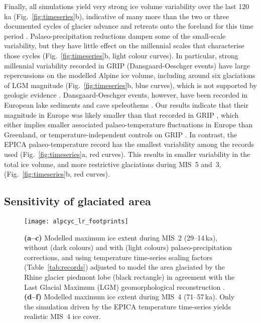 \documentclass[tc, manuscript]{copernicus}
\begin{document}
    Finally, all simulations yield very strong ice volume variability over the
    last 120\,ka (Fig.~\ref{fig:timeseries}b), indicative of many more than the
    two or three documented cycles of glacier advance and retreats onto the
    foreland for this time period \citep{Preusser.2004, Ivy-Ochs.etal.2008}.
    Palaeo-precipitation reductions dampen some of the small-scale variability,
    but they have little effect on the millennial scales that characterise
    those cycles (Fig.~\ref{fig:timeseries}b, light colour curves). In
    particular, strong millennial variability recorded in GRIP
     (Dansgaard-Oeschger events) have large repercussions
    on the modelled Alpine ice volume, including around six glaciations of LGM
    magnitude (Fig.~\ref{fig:timeseries}b, blue curves), which is not supported
    by geologic evidence \citep{Preusser.2004, Ivy-Ochs.etal.2008}.
    Dansgaard-Oeschger events, however, have been recorded in European
    lake sediments \citep{Wohlfarth.etal.2008} and cave speleothems
    \citep{Spotl.Mangini.2002, Luetscher.etal.2015}. Our results indicate that
    their magnitude in Europe was likely smaller than that recorded in
    GRIP , which either implies smaller associated
    palaeo-temperature fluctuations in Europe than Greenland, or
    temperature-independent controls on GRIP . In contrast,
    the EPICA palaeo-temperature record has the smallest variability among the
    records
    used (Fig.~\ref{fig:timeseries}a, red curves). This results in smaller
    variability in the total ice volume, and more restrictive glaciations
    during MIS~5 and~3, (Fig.~\ref{fig:timeseries}b, red curves).


\subsection{Sensitivity of glaciated area}
\label{sec:footprints}

    \begin{figure*}[t]
      \centerline{\texttt{[image: alpcyc\_lr\_footprints]}}
      \caption{%
        \textbf{(a--c)} Modelled maximum ice extent during MIS~2
        (29--14\,ka), without (dark colours) and with (light colours)
        palaeo-precipitation corrections, and using temperature time-series
        scaling factors (Table~\ref{tab:records}) adjusted to model the area
        glaciated by the Rhine glacier piedmont lobe (black rectangle) in
        agreement with the Last Glacial Maximum (LGM) geomorphological
        reconstruction \citep[solid black line,][]{Ehlers.etal.2011}.
        \textbf{(d--f)} Modelled maximum ice extent during MIS~4
        (71--57\,ka). Only the simulation driven by the EPICA temperature
        time-series yields realistic MIS~4 ice cover.}
      \label{fig:footprints}
    \end{figure*}
\end{document}

